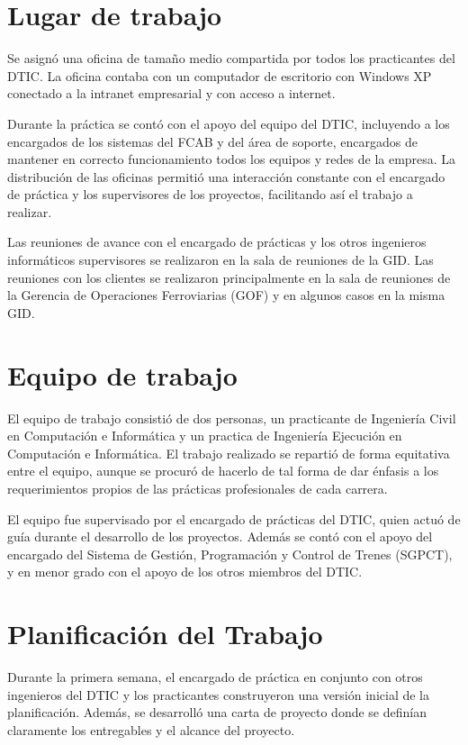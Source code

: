 \documentclass[oneside,12pt, letterpaper, titlepage]{book}
\begin{document}
\section{Lugar de trabajo}
Se asignó una oficina de tamaño medio compartida por todos los practicantes del DTIC. La oficina contaba con un computador de escritorio con Windows XP conectado a la intranet empresarial y con acceso a internet. 

Durante la práctica se contó con el apoyo del equipo del DTIC, incluyendo a los encargados de los sistemas del FCAB y del área de soporte, encargados de mantener en correcto funcionamiento todos los equipos y redes de la empresa. La distribución de las oficinas permitió una interacción constante con el encargado de práctica y los supervisores de los proyectos, facilitando así el trabajo a realizar.

Las reuniones de avance con el encargado de prácticas y los otros ingenieros informáticos supervisores se realizaron en la sala de reuniones de la GID. Las reuniones con los clientes se realizaron principalmente en la sala de reuniones de la Gerencia de Operaciones Ferroviarias (GOF) y en algunos casos en la misma GID. 

\section{Equipo de trabajo}
El equipo de trabajo consistió de dos personas, un practicante de Ingeniería Civil en Computación e Informática y un practica de Ingeniería Ejecución en Computación e Informática. El trabajo realizado se repartió de forma equitativa entre el equipo, aunque se procuró de hacerlo de tal forma de dar énfasis a los requerimientos propios de las prácticas profesionales de cada carrera.

El equipo fue supervisado por el encargado de prácticas del DTIC, quien actuó de guía durante el desarrollo de los proyectos. Además se contó con el apoyo del encargado del Sistema de Gestión, Programación y Control de Trenes (SGPCT), y en menor grado con el apoyo de los otros miembros del DTIC.

\section{Planificación del Trabajo}
Durante la primera semana, el encargado de práctica en conjunto con otros ingenieros del DTIC y los practicantes construyeron una versión inicial de la planificación. Además, se desarrolló una carta de proyecto donde se definían claramente los entregables y el alcance del proyecto.
\end{document}
